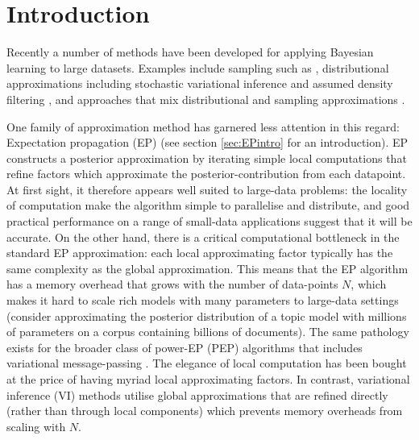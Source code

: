 \section{Introduction}


Recently a number of methods have been developed for applying Bayesian learning to large datasets. Examples include sampling such as \cite{ahn:distributedMCMC, bardenet:MCMC}, distributional approximations including stochastic variational inference \cite{hoffman:svi} and assumed density filtering \cite{miguel:pbp}, and approaches that mix distributional and sampling approximations \cite{gelman:dep,xu:sms}. 

One family of approximation method has garnered less attention in this regard: Expectation propagation (EP) \cite{minka:ep}\cite{opper:ec} (see section \ref{sec:EPintro} for an introduction). EP constructs a posterior approximation by iterating simple local computations that refine factors which approximate the posterior-contribution from each datapoint. At first sight, it therefore appears well suited to large-data problems: the locality of computation make the algorithm simple to parallelise and distribute, and good practical performance on a range of small-data applications suggest that it will be accurate\cite{kuss:gpep,barthelme:ep_likelihood,cunningham:gaussianEP}. On the other hand, there is a critical computational bottleneck in the standard EP approximation: each local approximating factor typically has the same complexity as the global approximation. This means that the EP algorithm has a memory overhead that grows with the number of data-points $N$, which makes it hard to scale rich models with many parameters to large-data settings (consider approximating the posterior distribution of a topic model with millions of parameters on a corpus containing billions of documents). The same pathology exists for the broader class of power-EP (PEP) algorithms \cite{minka:powerep} that includes variational message-passing \cite{winn:vmp}. The elegance of local computation has been bought at the price of having myriad local approximating factors. In contrast, variational inference (VI) methods \cite{jordan:variational,beal:variational} utilise global approximations that are refined directly (rather than through local components) which prevents memory overheads from scaling with $N$. 

